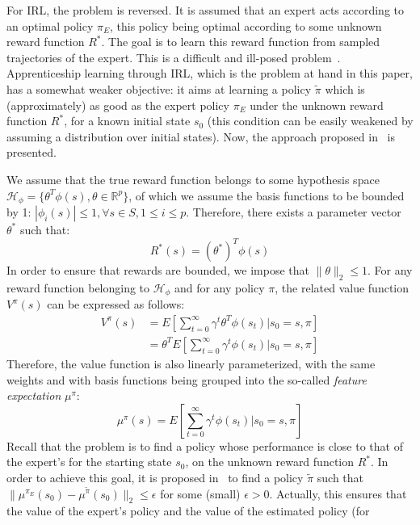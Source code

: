 \documentclass{jfpda2011}
\begin{document}
For IRL, the problem is reversed. It is
assumed that an expert acts according to an optimal policy $\pi_E$,
this policy being optimal according to some unknown reward function
$R^*$. The goal is to learn this
reward function from sampled trajectories of the expert. This is a
difficult and ill-posed problem~\citep{ng2000algorithms}. Apprenticeship
learning through IRL, which is the problem at hand in this paper,
has a somewhat weaker objective: it aims at learning a policy
$\tilde{\pi}$ which is (approximately) as good as the expert policy
$\pi_E$ under the unknown reward function $R^*$, for a known initial
state $s_0$ (this condition can be easily weakened by assuming a
distribution over initial states). Now, the approach proposed in~\citep{abbeel2004apprenticeship} is
presented.

We assume that the true reward function belongs to some hypothesis
space $\mathcal{H}_\phi = \{\theta^T \phi(s),
\theta\in\mathbb{R}^p\}$, of which we assume the basis functions to
be bounded by 1: $|\phi_i(s)|\leq 1, \forall s\in S, 1\leq i \leq
p$. Therefore, there exists a parameter vector $\theta^*$ such that:
\begin{equation}
  R^*(s) = (\theta^*)^T \phi(s)
\end{equation}
In order to ensure that rewards are bounded, we impose that
$\|\theta\|_2\leq 1$. For any reward function belonging to
$\mathcal{H}_\phi$ and for any policy $\pi$, the related value
function $V^\pi(s)$ can be expressed as follows:
\begin{align}
  V^\pi(s) &= E[\sum_{t=0}^\infty \gamma^t \theta^T \phi(s_t)|s_0=s, \pi]
  \\
  &= \theta^T  E[\sum_{t=0}^\infty \gamma^t \phi(s_t)|s_0=s, \pi]
\end{align}
Therefore, the value function is also linearly parameterized, with
the same weights and with basis functions being grouped into the
so-called \emph{feature expectation} $\mu^\pi$:
\begin{equation}
  \mu^\pi(s) = E[\sum_{t=0}^\infty \gamma^t \phi(s_t)|s_0=s, \pi]
\end{equation}
Recall that the problem is to find a policy whose performance is
close to that of the expert's for the starting state $s_0$, on the
unknown reward function $R^*$. In order to achieve this goal, it is
proposed in~\citep{abbeel2004apprenticeship} to find a policy $\tilde{\pi}$ such
that $\|\mu^{\pi_E}(s_0)-\mu^{\tilde{\pi}}(s_0)\|_2\leq \epsilon$
for some (small) $\epsilon>0$. Actually, this ensures that the value
of the expert's policy and the value of the estimated policy (for
\end{document}
